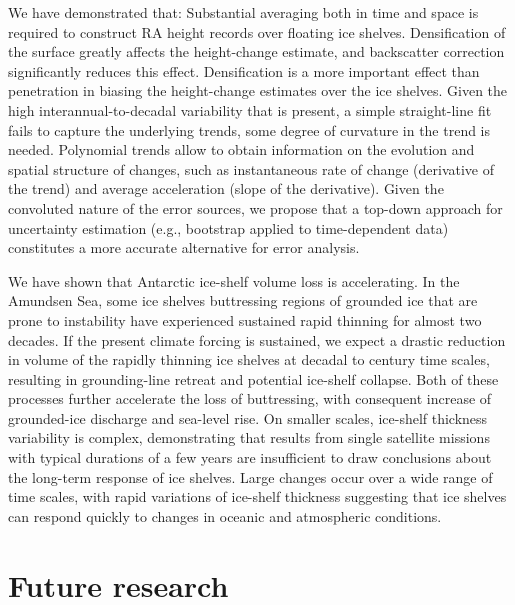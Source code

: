 We have demonstrated that: Substantial averaging both in time and space is required to construct RA height records over floating ice shelves. Densification of the surface greatly affects the height-change estimate, and backscatter correction significantly reduces this effect. Densification is a more important effect than penetration in biasing the height-change estimates over the ice shelves. Given the high interannual-to-decadal variability that is present, a simple straight-line fit fails to capture the underlying trends, some degree of curvature in the trend is needed. Polynomial trends allow to obtain information on the evolution and spatial structure of changes, such as instantaneous rate of change (derivative of the trend) and average acceleration (slope of the derivative). Given the convoluted nature of the error sources, we propose that a top-down approach for uncertainty estimation (e.g., bootstrap applied to time-dependent data) constitutes a more accurate alternative for error analysis.

We have shown that Antarctic ice-shelf volume
loss is accelerating. In the Amundsen Sea,
some ice shelves buttressing regions of grounded
ice that are prone to instability have experienced
sustained rapid thinning for almost two decades.
If the present climate forcing is sustained, we
expect a drastic reduction in volume of the rapidly
thinning ice shelves at decadal to century
time scales, resulting in grounding-line retreat
and potential ice-shelf collapse. Both of these processes
further accelerate the loss of buttressing,
with consequent increase of grounded-ice
discharge and sea-level rise. On smaller scales,
ice-shelf thickness variability is complex, demonstrating
that results from single satellite missions
with typical durations of a few years are
insufficient to draw conclusions about the long-term
response of ice shelves. Large changes occur
over a wide range of time scales, with rapid variations
of ice-shelf thickness suggesting that ice
shelves can respond quickly to changes in oceanic
and atmospheric conditions.

\section*{Future research}


